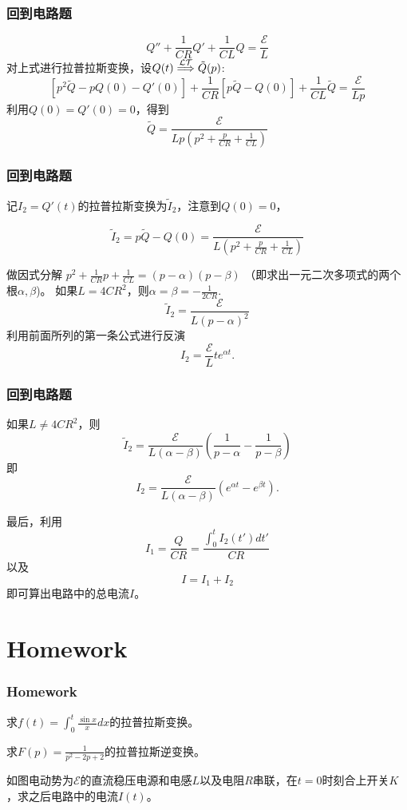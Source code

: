\documentclass[CJK]{beamer}
\begin{document}
\begin{frame}
  \frametitle{回到电路题}
  
  $$Q''+ \frac{1}{CR} Q' +  \frac{1}{CL}Q = \frac{\mathcal{E}}{L} $$  
  对上式进行拉普拉斯变换，设$Q(t) \stackrel{\mathcal{LT}}{\Longrightarrow} \tilde{Q}(p)$:
  $$ \left[p^2 \tilde{Q} - pQ(0) - Q'(0)\right] + \frac{1}{CR} \left[p\tilde{Q} - Q(0)\right] + \frac{1}{CL} \tilde{Q} = \frac{\mathcal{E}}{L p } $$
  利用$Q(0) = Q'(0) = 0$，得到
  $$  \tilde{Q} = \frac{\mathcal{E}}{Lp\left(p^2+\frac{p}{CR} + \frac{1}{CL}\right)} $$
  
\end{frame}

\begin{frame}
  \frametitle{回到电路题}
  
  记$I_2=Q'(t)$的拉普拉斯变换为$\tilde{I}_2$，注意到$Q(0)=0$，
  
  $$  \tilde{I}_2 =p \tilde{Q} - Q(0)= \frac{\mathcal{E}}{L\left(p^2+\frac{p}{CR} + \frac{1}{CL}\right)} $$

  做因式分解 $p^2 + \frac{1}{CR} p + \frac{1}{CL} = (p-\alpha)(p-\beta)$ （即求出一元二次多项式的两个根$\alpha,\beta$)。
    如果$L = 4CR^2$，则$\alpha = \beta = -\frac{1}{2CR}$.
  $$  \tilde{I}_2 =\frac{\mathcal{E}}{L(p-\alpha)^2} $$   
    利用前面所列的第一条公式进行反演
    $$ I_2 = \frac{\mathcal{E}}{L}t e^{\alpha t} .$$
  
\end{frame}


\begin{frame}
  \frametitle{回到电路题}
    如果$L \ne 4CR^2$，则
    $$\tilde{I}_2 = \frac{\mathcal{E}}{L(\alpha-\beta)} \left(\frac{1}{p-\alpha}-\frac{1}{p-\beta}\right) $$
    即
    $$I_2 = \frac{\mathcal{E}}{L(\alpha-\beta)}\left(e^{\alpha t}- e^{\beta t}\right).$$
  
  最后，利用
  $$I_1 = \frac{Q}{CR} = \frac{\int_0^tI_2(t')dt'}{CR}$$
  以及 $$I=I_1+I_2$$
  即可算出电路中的总电流$I$。
  
\end{frame}


\section{Homework}

\begin{frame}
\frametitle{Homework}

\bitem
\item{求$f(t) = \int_0^t \frac{\sin x}{x}dx$的拉普拉斯变换。}
\item{求$F(p) = \frac{1}{p^2-2p+2}$的拉普拉斯逆变换。}
\item{如图电动势为$\mathcal{E}$的直流稳压电源和电感$L$以及电阻$R$串联，在$t=0$时刻合上开关$K$，求之后电路中的电流$I(t)$。
}
  \eitem

\end{frame}
\end{document}
